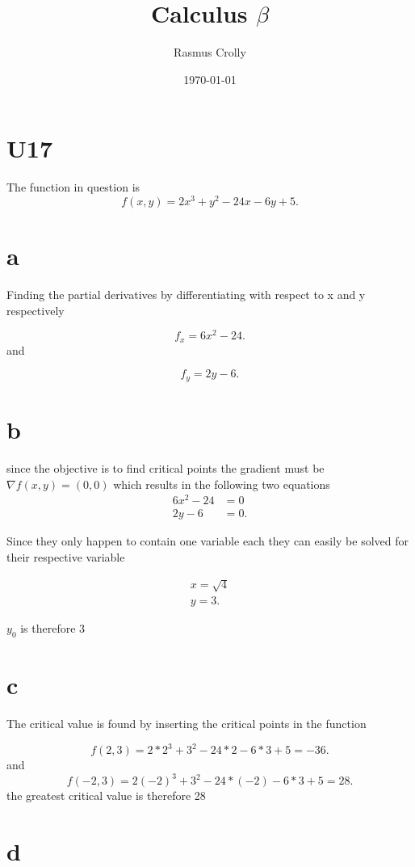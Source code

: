 \documentclass[12pt,a4paper]{article}
\title{Calculus $\beta$}
\author{Rasmus Crolly}
\date{\today}
\begin{document}
\maketitle
	



\section{U17} 

The function in question is \[
	f(x,y)=2x^3+y^2-24x-6y+5
.\] 


\section{a} 

Finding the partial derivatives by differentiating with respect to x and y respectively

\[
f_{x} = 6x^2-24
.\] 
and

\[
f_{y} = 2y-6
.\] 


\section{b}

since the objective is to find critical points the gradient must be $\nabla f(x,y) = (0, 0)$ which results in the following two equations
\begin{align*}
	6x^2-24&=0\\ 2y-6&=0
.\end{align*}

Since they only happen to contain one variable each they can easily be solved for their respective variable

\begin{align*}
	x=\sqrt{4}\\
	y=3
.\end{align*}

$y_0$ is therefore 3


\section{c}

The critical value is found by inserting the critical points in the function

\[
	f(2,3)=2*2^3+3^2-24*2-6*3+5= -36
.\] 
and
\[
	f(-2,3)=2(-2)^3+3^2-24*(-2)-6*3+5=28
.\] 
the greatest critical value is therefore 28


\section{d} 
\end{document}
